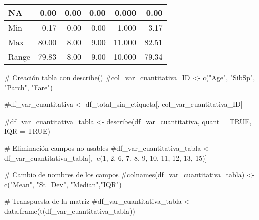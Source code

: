 \documentclass[
]{article}
\newenvironment{Shaded}{\begin{snugshade}}{\end{snugshade}}
\newcommand{\CommentTok}[1]{\textcolor[rgb]{0.50,0.62,0.50}{#1}}
\begin{document}
\begin{table}
\begin{tabular}[t]{l|r|r|r|r|r}
\hline
\hspace{1em}NA & 0.00 & 0.00 & 0.00 & 0.000 & 0.00\\
\hline
\hspace{1em}Min & 0.17 & 0.00 & 0.00 & 1.000 & 3.17\\
\hline
\hspace{1em}Max & 80.00 & 8.00 & 9.00 & 11.000 & 82.51\\
\hline
\hspace{1em}Range & 79.83 & 8.00 & 9.00 & 10.000 & 79.34\\
\hline
\end{tabular}
\end{table}

\begin{Shaded}
\begin{Highlighting}[]
\CommentTok{# Creación tabla con describe()}
\CommentTok{#col_var_cuantitativa_ID <- c("Age", "SibSp", "Parch", "Fare")}

\CommentTok{#df_var_cuantitativa <- df_total_sin_etiqueta[, col_var_cuantitativa_ID]}

\CommentTok{#df_var_cuantitativa_tabla <- describe(df_var_cuantitativa, quant = TRUE, IQR = TRUE)}

\CommentTok{# Eliminación campos no usables}
\CommentTok{#df_var_cuantitativa_tabla <- df_var_cuantitativa_tabla[, -c(1, 2, 6, 7, 8, 9, 10, 11, 12, 13, 15)]}

\CommentTok{# Cambio de nombres de los campos}
\CommentTok{#colnames(df_var_cuantitativa_tabla) <- c("Mean", "St_Dev", "Median","IQR")}

\CommentTok{# Transpuesta de la matriz}
\CommentTok{#df_var_cuantitativa_tabla <- data.frame(t(df_var_cuantitativa_tabla))}
\end{Highlighting}
\end{Shaded}
\end{document}
